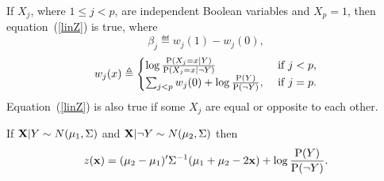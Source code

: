 \documentclass[10pt,a4paper]{article}
\theoremstyle{plain} \newtheorem{Lem}{Lemma}
\begin{document}
If $X_j$, where $1 \le j < p$, are independent Boolean variables and $X_p = 1$,
then equation~(\ref{linZ}) is true, where
$$ \beta_j \eqdef w_j(1) - w_j(0), $$
\begin{equation}
w_j(x) \triangleq
\begin{cases}
\log \frac {\mathrm P(X_j = x|Y)} {\mathrm P(X_j = x|\neg Y)} &\text{ if } j < p, \\
\sum_{j < p} w_j(0) + \log \frac {\mathrm P(Y)} {\mathrm P(\neg Y)}, &\text{ if } j = p.
\end{cases}
\end{equation}
Equation~(\ref{linZ}) is also true if some $X_j$ are equal or opposite to each other.


If 
$\mathbf X|Y      \sim N(\mathbf \mu_1, \mathrm \Sigma)$ and 
$\mathbf X|\neg Y \sim N(\mathbf \mu_2, \mathrm \Sigma)$
then
$$ z(\mathbf x) = (\mathbf \mu_2 - \mathbf \mu_1)' \mathrm \Sigma^{-1} (\mathbf \mu_1 + \mathbf \mu_2 - 2 \mathbf x) + \log \frac {\mathrm P(Y)} {\mathrm P(\neg Y)}. $$
\end{document}
